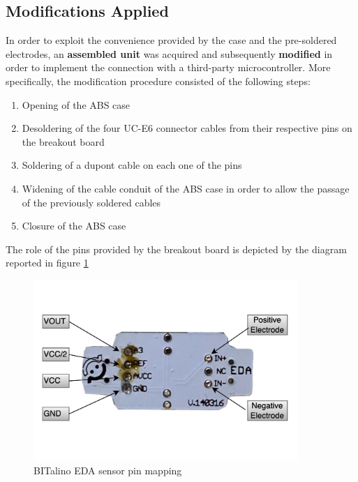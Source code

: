 
\subsection{Modifications Applied}\label{subsec:bitalino-modifications}

In order to exploit the convenience provided by the case and the pre-soldered electrodes, an \textbf{assembled unit} was acquired and subsequently \textbf{modified} in order to implement the connection with a third-party microcontroller. More specifically, the modification procedure consisted of the following steps: 

\begin{enumerate}
    \item Opening of the ABS case
    \item Desoldering of the four UC-E6 connector cables from their respective pins on the breakout board
    \item Soldering of a dupont cable on each one of the pins
    \item Widening of the cable conduit of the ABS case in order to allow the passage of the previously soldered cables
    \item Closure of the ABS case 
\end{enumerate}

The role of the pins provided by the breakout board is depicted by the diagram reported in figure \ref{fig:bitalino-pinmap}

\begin{figure}[h]
    \centering
    \includegraphics[width=10cm]{./images/bitalino.drawio.png}
    \caption{BITalino EDA sensor pin mapping}
    \label{fig:bitalino-pinmap}
\end{figure}

\vspace{1cm}

